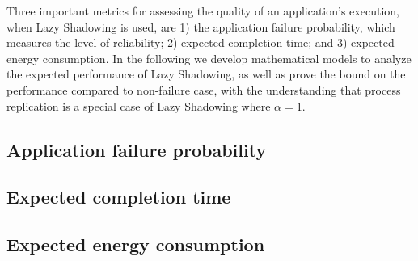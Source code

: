 Three important metrics for assessing the quality of an application's execution, when Lazy Shadowing is used, are 1) the application failure probability, which measures the level of reliability; 2) expected completion time; and 3) expected energy consumption. In the following we develop mathematical models to analyze the expected performance of Lazy Shadowing, as well as prove the bound on the performance compared to non-failure case, with the understanding
that process replication is a special case of Lazy Shadowing where $\alpha=1$. 



\subsection{Application failure probability}
\label{anal_app_fail}


\subsection{Expected completion time}
\label{anal_time}


\subsection{Expected energy consumption}
\label{anal_energy}

